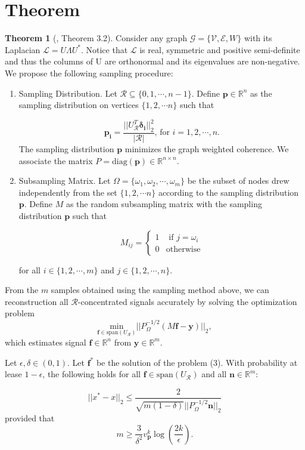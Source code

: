 \documentclass[a4paper]{article}
\newcommand{\R}{\mathcal{R}}
\newcommand{\RR}{\mathbb{R}}
\newcommand{\G}{\mathcal{G}}
\newcommand{\V}{\mathcal{V}}
\newcommand{\E}{\mathcal{E}}
\newcommand{\La}{\mathcal{L}}
\newcommand{\UR}{U_{\mathcal{R}}}
\newcommand{\vv}{\mathit{v}}
\theoremstyle{definition}
\newtheorem*{thm}{Theorem}
\begin{document}
\section{Theorem}
\begin{thm}[\cite{puy}, Theorem 3.2]
Consider any graph $\G = \{\V, \E, W\}$ with its Laplacian $\La = U\Lambda U^*$. Notice that $\La$ is real, symmetric and positive semi-definite and thus the columns of U are orthonormal and its eigenvalues are non-negative. We propose the following sampling procedure:

\begin{enumerate}

\item Sampling Distribution. Let $\R \subseteq \{0,1,\cdots, n-1\}$. Define $\bm{p} \in \RR^n$ as the sampling distribution on vertices $\{1,2, \cdots n\}$  such that 

\[\bm{p_i} = \frac{||U^T_\R\bm{\delta_i}||^2_2}{|\R|} \text{, for } i = 1,2 ,\cdots, n. \tag{1}\]  
The sampling distribution $\bm{p}$ minimizes the graph weighted coherence. We associate the matrix $P = \text{diag}(\bm{p}) \in \RR^{n\times n}$.

\item Subsampling Matrix. Let $\Omega = \{\omega_1, \omega_2, \cdots, \omega_m\}$ be the subset of nodes drew independently from the set $\{1,2,\cdots n\}$ according to the sampling distribution $\bm{p}$. Define $M$ as the random subsampling matrix with the sampling distribution $\bm{p}$ such that

\[M_{ij} = 
\begin{cases} 
      1 & \text{ if } j = \omega_{i}\\
      0 & \text{otherwise}
   \end{cases}
\tag{2}\] 

for all $i \in \{1,2,\cdots,m\}$ and $j \in \{1,2,\cdots, n\}$.

\end{enumerate}

\medskip

From the $m$ samples obtained using the sampling method above, we can reconstruction all $\R$-concentrated signals accurately by solving the optimization problem 
\[\underset{\bm{f} \in \text{span}(\UR)}{\text{min}}\vert\vert P^{-1/2}_\Omega (M\bm{f}-\bm{y})\vert\vert_2, \tag{3}\] 
which estimates signal $\bm{f} \in \RR^n$ from $\bm{y} \in \RR^m$. 

Let $\epsilon, \delta \in (0,1)$. Let $\bm{f^*}$ be the solution of the problem (3). With probability at lease $1-\epsilon$, the following holds for all $\bm{f}\in \text{span}(U_{\R})$ and all $\bm{n}\in \RR^m: $

\[||x^* - x||_2 \leq \frac{2}{\sqrt{m(1-\delta)} ||P_{\Omega}^{-1/2} \bm{n}||_2} \tag{4}\]
provided that \[m \geq \frac{3}{\delta^2}\vv^k_{\bm{p}}\log(\frac{2k}{\epsilon}). \tag{5} \]

\end{thm}
\end{document}
